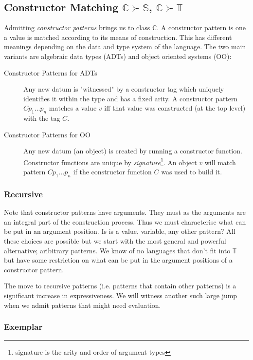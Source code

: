 \documentclass[acmsmall]{acmart}
\begin{document}
\subsection{Constructor Matching $\mathbb{C} \succ \mathbb{S}$, $\mathbb{C} \succ \mathbb{T}$}
Admitting \emph{constructor patterns} brings us to class $\mathbb{C}$.  A constructor pattern is one a value is matched according to its means of construction.  This has different meanings depending on the data and type system of the language.  The two main variants are algebraic data types (ADTs) and object oriented systems (OO):
\begin{description}
    \item[Constructor Patterns for ADTs] Any new datum is "witnessed" by a constructor tag which uniquely identifies it within the type and has a fixed arity.  A constructor pattern $C p_1 ... p_n$ matches a value $v$ iff that value was constructed (at the top level) with the tag $C$.
    \item[Constructor Patterns for OO] Any new datum (an object) is created by running a constructor function.  Constructor functions are unique by \emph{signature}\footnote{signature is the arity and order of argument types}.  An object $v$ will match pattern $C p_1 ... p_n$ if the constructor function $C$ was used to build it.
\end{description}

\subsubsection{Recursive}

Note that constructor patterns have arguments.  They must as the arguments are an integral part of the construction process.  Thus we must characterise what can be put in an argument position.  Is is a value, variable, any other pattern?  All these choices are possible but we start with the most general and powerful alternative; aribitrary patterns.  We know of no languages that don't fit into $\mathbb{T}$ but have some restriction on what can be put in the argument positions of a constructor pattern.

The move to recursive patterns (i.e. patterns that contain other patterns) is a significant increase in expressiveness.  We will witness another such large jump when we admit patterns that might need evaluation.

\subsubsection{Exemplar}
\end{document}
